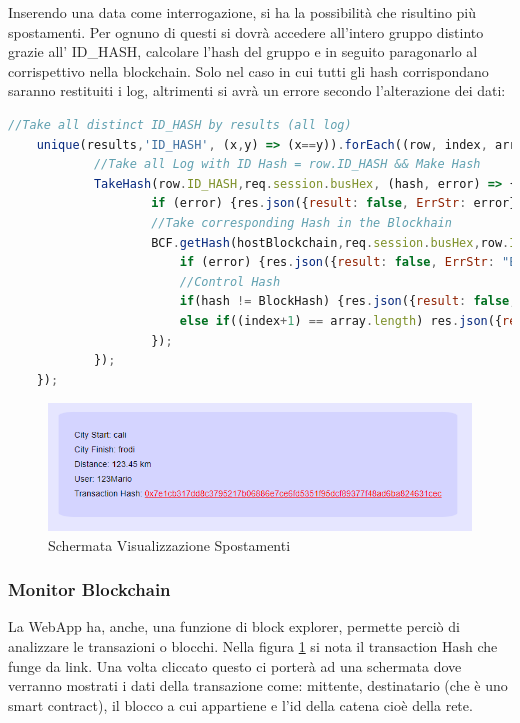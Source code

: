 \documentclass[11pt,a4paper,titlepage,twoside,openright]{report}
\begin{document}
Inserendo una data come interrogazione, si ha la possibilità che risultino più spostamenti. Per ognuno di questi si dovrà accedere all'intero gruppo distinto grazie all' ID\_HASH, calcolare l'hash del gruppo e in seguito paragonarlo al corrispettivo nella blockchain. Solo nel caso in cui tutti gli hash corrispondano saranno restituiti i log, altrimenti si avrà un errore secondo l'alterazione dei dati:
\begin{lstlisting}[language=JavaScript]
	//Take all distinct ID_HASH by results (all log)
	unique(results,'ID_HASH', (x,y) => (x==y)).forEach((row, index, array) => {
  			//Take all Log with ID Hash = row.ID_HASH && Make Hash
  			TakeHash(row.ID_HASH,req.session.busHex, (hash, error) => {
  					if (error) {res.json({result: false, ErrStr: error});return;}
  					//Take corresponding Hash in the Blockhain
					BCF.getHash(hostBlockchain,req.session.busHex,row.ID_HASH, (error, BlockHash) => {
						if (error) {res.json({result: false, ErrStr: "Errore nel contattare la blockchain"});return;}
						//Control Hash
  						if(hash != BlockHash) {res.json({result: false, ErrStr: "I dati Sono stati alterati"});return;}
  						else if((index+1) == array.length) res.json({result: true, ErrStr: "", LOG: results});
					});
  			});
  	});
\end{lstlisting}

\begin{figure}[h]
	\includegraphics[width=\textwidth]{Log_Print}
	\centering
	\caption{Schermata Visualizzazione Spostamenti}
	\label{fig:Log_Print}
\end{figure}

\subsubsection{Monitor Blockchain}
La WebApp ha, anche, una funzione di block explorer, permette perciò di analizzare le transazioni o blocchi. Nella figura  \ref{fig:Log_Print} si nota il transaction Hash che funge da link. Una volta cliccato questo ci porterà ad una schermata dove verranno mostrati i dati della transazione come: mittente, destinatario (che è uno smart contract), il blocco a cui appartiene e l'id della catena cioè della rete.
\end{document}
